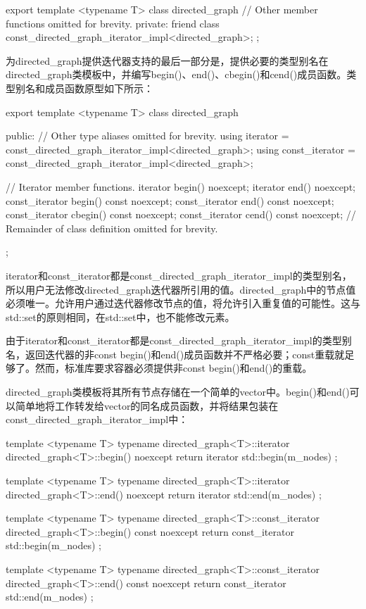\begin{cpp}
export template <typename T>
class directed_graph
{
    // Other member functions omitted for brevity.
    private:
        friend class const_directed_graph_iterator_impl<directed_graph>;
};
\end{cpp}


为directed\_graph提供迭代器支持的最后一部分是，提供必要的类型别名在directed\_graph类模板中，并编写begin()、end()、cbegin()和cend()成员函数。类型别名和成员函数原型如下所示：

\begin{cpp}
export template <typename T>
class directed_graph
{
    public:
        // Other type aliases omitted for brevity.
        using iterator = const_directed_graph_iterator_impl<directed_graph>;
        using const_iterator = const_directed_graph_iterator_impl<directed_graph>;

        // Iterator member functions.
        iterator begin() noexcept;
        iterator end() noexcept;
        const_iterator begin() const noexcept;
        const_iterator end() const noexcept;
        const_iterator cbegin() const noexcept;
        const_iterator cend() const noexcept;
        // Remainder of class definition omitted for brevity.
};
\end{cpp}

iterator和const\_iterator都是const\_directed\_graph\_iterator\_impl的类型别名，所以用户无法修改directed\_graph迭代器所引用的值。directed\_graph中的节点值必须唯一。允许用户通过迭代器修改节点的值，将允许引入重复值的可能性。这与std::set的原则相同，在std::set中，也不能修改元素。

由于iterator和const\_iterator都是const\_directed\_graph\_iterator\_impl的类型别名，返回迭代器的非const begin()和end()成员函数并不严格必要；const重载就足够了。然而，标准库要求容器必须提供非const begin()和end()的重载。

directed\_graph类模板将其所有节点存储在一个简单的vector中。begin()和end()可以简单地将工作转发给vector的同名成员函数，并将结果包装在const\_directed\_graph\_iterator\_impl中：

\begin{cpp}
template <typename T>
typename directed_graph<T>::iterator
    directed_graph<T>::begin() noexcept { return iterator{ std::begin(m_nodes) }; }

template <typename T>
typename directed_graph<T>::iterator
    directed_graph<T>::end() noexcept { return iterator { std::end(m_nodes) }; }

template <typename T>
typename directed_graph<T>::const_iterator
    directed_graph<T>::begin() const noexcept
{ return const_iterator { std::begin(m_nodes) }; }

template <typename T>
typename directed_graph<T>::const_iterator
    directed_graph<T>::end() const noexcept
{ return const_iterator { std::end(m_nodes) }; }
\end{cpp}

